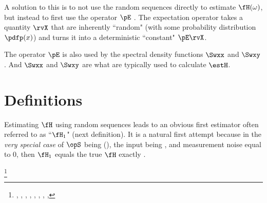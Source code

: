 A solution to this is to not use the random sequences directly to estimate $\fH(\omega)$, 
but instead to first use the  operator $\pE$ .
The expectation operator takes a quantity $\rvX$ that are inherently ``random" 
(with some probability distribution $\pdfp(x)$) and 
turns it into a deterministic ``constant" $\pE\rvX$.

The operator $\pE$ is also used by the spectral density functions 
$\Swxx$ and $\Swxy$ .
And $\Swxx$ and $\Swxy$ are what are typically used to calculate $\estH$.

\section{Definitions}
Estimating $\fH$ using random sequences leads to an obvious first estimator 
often referred to as ``$\fH_1$" (next definition).
It is a natural first attempt because in the \emph{very special case} of $\opS$ being 
 (), the input being 
, and measurement noise equal to $0$,
then $\fH_1$ equals the true $\fH$ exactly .
\begin{definition}
\footnote{
  ,
  ,
  ,
  ,
  ,
  ,
  ,
  ,
  }
\label{def:H1}
\end{definition}

